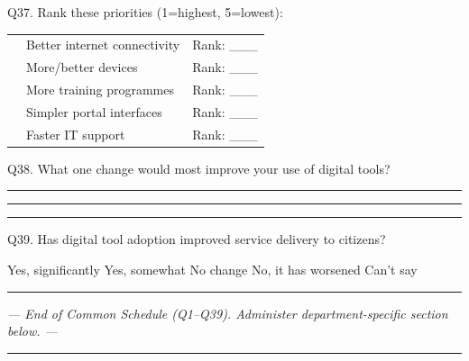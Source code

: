 \documentclass[10pt,a4paper]{article}
\begin{document}
\vspace{4pt}
\vspace{3pt}

\noindent Q37. Rank these priorities (1=highest, 5=lowest):\vspace{4pt}

\noindent\begin{tabularx}{\textwidth}{@{}L{0.5cm} X L{1.5cm}@{}}
& Better internet connectivity & Rank: \_\_\_ \\[3pt]
& More/better devices & Rank: \_\_\_ \\[3pt]
& More training programmes & Rank: \_\_\_ \\[3pt]
& Simpler portal interfaces & Rank: \_\_\_ \\[3pt]
& Faster IT support & Rank: \_\_\_ \\
\end{tabularx}

\vspace{4pt}
\noindent Q38. What one change would most improve your use of digital tools?\vspace{4pt}

\noindent\rule{\textwidth}{0.4pt}\vspace{4pt}
\noindent\rule{\textwidth}{0.4pt}\vspace{4pt}
\noindent\rule{\textwidth}{0.4pt}\vspace{4pt}

\noindent Q39. Has digital tool adoption improved service delivery to citizens?\vspace{2pt}

\noindent {\Large$\square$} Yes, significantly\quad{\Large$\square$} Yes, somewhat\quad{\Large$\square$} No change\quad{\Large$\square$} No, it has worsened\quad{\Large$\square$} Can't say

\vspace{4pt}\noindent\rule{\textwidth}{1pt}\vspace{2pt}
\begin{center}\textit{--- End of Common Schedule (Q1--Q39). Administer department-specific section below. ---}\end{center}
\rule{\textwidth}{0.5pt}

\newpage
\vspace{4pt}
\end{document}
